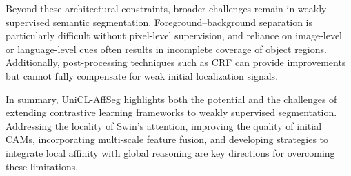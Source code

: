 Beyond these architectural constraints, broader challenges remain in weakly supervised semantic segmentation. Foreground–background separation is particularly difficult without pixel-level supervision, and reliance on image-level or language-level cues often results in incomplete coverage of object regions. Additionally, post-processing techniques such as CRF can provide improvements but cannot fully compensate for weak initial localization signals.  

In summary, UniCL-AffSeg  highlights both the potential and the challenges of extending contrastive learning frameworks to weakly supervised segmentation. Addressing the locality of Swin’s attention, improving the quality of initial CAMs, incorporating multi-scale feature fusion, and developing strategies to integrate local affinity with global reasoning are key directions for overcoming these limitations.
